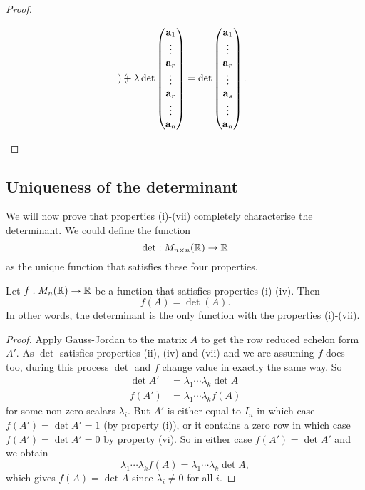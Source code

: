 \documentclass[10pt, a4paper]{article}
\begin{document}
\begin{enumerate}[label = (\roman*)]
\begin{proof}
\begin{enumerate}[label = (\roman*)]
\[\begin{pmatrix}
            \end{pmatrix}
            +
            \lambda
            \det\begin{pmatrix}
                \mathbf{a}_1 \\ \vdots \\ \mathbf{a}_r \\ \vdots \\ \mathbf{a}_r \\ \vdots \\ \mathbf{a}_n
            \end{pmatrix}
            =
            \det\begin{pmatrix}
                \mathbf{a}_1 \\ \vdots \\ \mathbf{a}_r \\ \vdots \\ \mathbf{a}_s \\ \vdots \\ \mathbf{a}_n
            \end{pmatrix}.
            \]
        \end{enumerate}
    \end{proof}
\end{enumerate}

\subsection{Uniqueness of the determinant}
We will now prove that properties (i)-(vii) completely characterise the determinant.
We could define the function
\[
\det : M_{n \times n}(\mathbb{R}) \rightarrow \mathbb{R}
\]
as the unique function that satisfies these four properties.
\begin{theorem}\label{pre:linalg:thm:uniquedet}
    Let $f: M_n(\mathbb{R}) \rightarrow \mathbb{R}$ be a function that satisfies properties (i)-(iv).
    Then
    \[
    f(A) = \det(A).
    \]
    In other words,
    the determinant is the only function with the properties (i)-(vii).
    \begin{proof}
        Apply Gauss-Jordan to the matrix $A$ to get the row reduced echelon form $A'$.
        As $\det$ satisfies properties (ii), (iv) and (vii) and we are assuming $f$ does too,
        during this process $\det$ and $f$ change value in exactly the same way.
        So
        \begin{align*}
            \det A' &= \lambda_1\dotsi\lambda_k\det A \\
            f(A') &= \lambda_1\dotsi\lambda_kf(A)
        \end{align*}
        for some non-zero scalars $\lambda_i$.
        But $A'$ is either equal to $I_n$ in which case $f(A') = \det A' = 1$ (by property (i)),
        or it contains a zero row in which case $f(A') = \det A' = 0$ by property (vi).
        So in either case $f(A') = \det A'$ and we obtain
        \[
        \lambda_1\dotsi\lambda_kf(A) = \lambda_1\dotsi\lambda_k\det A,
        \]
        which gives $f(A) = \det A$ since $\lambda_i \neq 0$ for all $i$.
    \end{proof}
\end{theorem}
\end{document}
